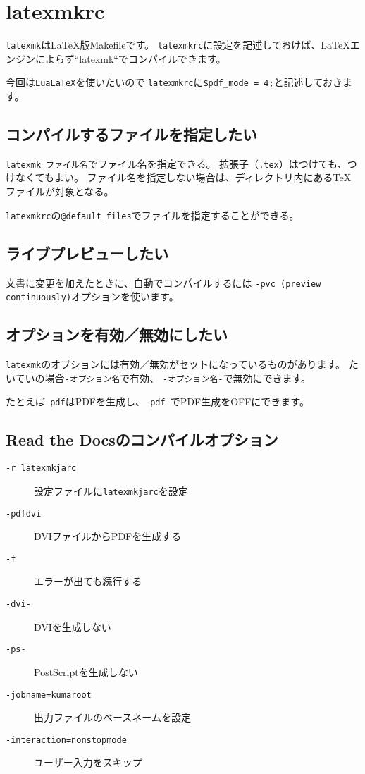 \section{latexmkrc}

\texttt{latexmk}はLaTeX版Makefileです。
\texttt{latexmkrc}に設定を記述しておけば、LaTeXエンジンによらず``latexmk``でコンパイルできます。

今回は\texttt{LuaLaTeX}を使いたいので
\texttt{latexmkrc}に\texttt{\$pdf\_mode = 4;}と記述しておきます。

\subsection{コンパイルするファイルを指定したい}

\texttt{latexmk ファイル名}でファイル名を指定できる。
拡張子（\texttt{.tex}）はつけても、つけなくてもよい。
ファイル名を指定しない場合は、ディレクトリ内にあるTeXファイルが対象となる。

\texttt{latexmkrc}の\texttt{@default\_files}でファイルを指定することができる。

\subsection{ライブプレビューしたい}

文書に変更を加えたときに、自動でコンパイルするには
\texttt{-pvc (preview continuously)}オプションを使います。

\subsection{オプションを有効／無効にしたい}

\texttt{latexmk}のオプションには有効／無効がセットになっているものがあります。
たいていの場合\texttt{-オプション名}で有効、
\texttt{-オプション名-}で無効にできます。

たとえば\texttt{-pdf}はPDFを生成し、\texttt{-pdf-}でPDF生成をOFFにできます。

\subsection{Read the Docsのコンパイルオプション}

\begin{description}
    \item[\texttt{-r latexmkjarc}] 設定ファイルに\texttt{latexmkjarc}を設定
    \item[\texttt{-pdfdvi}] DVIファイルからPDFを生成する
    \item[\texttt{-f}] エラーが出ても続行する
    \item[\texttt{-dvi-}] DVIを生成しない
    \item[\texttt{-ps-}] PostScriptを生成しない
    \item[\texttt{-jobname=kumaroot}] 出力ファイルのベースネームを設定
    \item[\texttt{-interaction=nonstopmode}] ユーザー入力をスキップ
\end{description}
